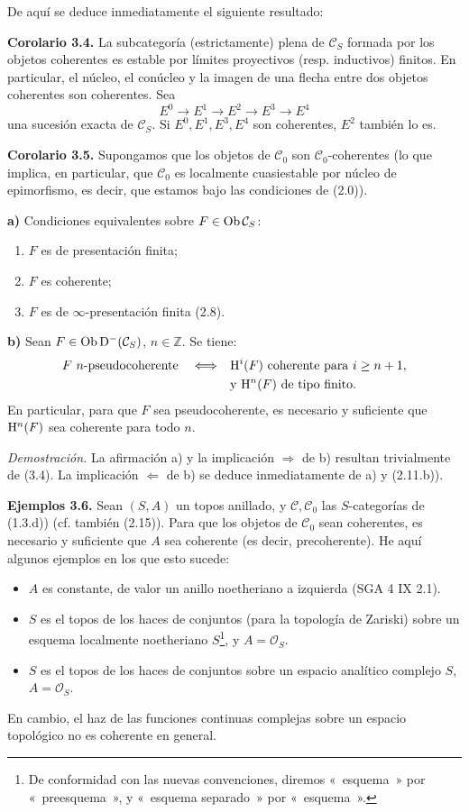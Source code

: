 De aquí se deduce inmediatamente el siguiente resultado:

\textbf{Corolario 3.4.} La subcategoría (estrictamente) plena de \(\mathcal C_S\) formada por los objetos coherentes es estable por límites proyectivos (resp. inductivos) finitos. En particular, el núcleo, el conúcleo y la imagen de una flecha entre dos objetos coherentes son coherentes. Sea
\[
  E^0\longrightarrow E^1\longrightarrow E^2\longrightarrow E^3\longrightarrow E^4
\]
una sucesión exacta de \(\mathcal C_S\). Si \(E^0,E^1,E^3,E^4\) son coherentes, \(E^2\) también lo es.

\textbf{Corolario 3.5.} Supongamos que los objetos de \(\mathcal C_0\) son \(\mathcal C_0\)-coherentes (lo que implica, en particular, que \(\mathcal C_0\) es localmente cuasiestable por núcleo de epimorfismo, es decir, que estamos bajo las condiciones de (2.0)).

\textbf{a)} Condiciones equivalentes sobre \(F\in\operatorname{Ob}\mathcal C_S\):
\begin{enumerate}[label=(\roman*)]
\item \(F\) es de presentación finita;
\item \(F\) es coherente;
\item \(F\) es de \(\infty\)-presentación finita (2.8).
\end{enumerate}

\textbf{b)} Sean \(F\in\operatorname{Ob}\mathrm D^-(\mathcal C_S)\), \(n\in\mathbb Z\). Se tiene:
\[
\begin{split}
F\ n\text{-pseudocoherente}
\quad\Longleftrightarrow\quad&
\mathrm H^i(F)\text{ coherente para }i\geq n+1,\\
&\text{y }\mathrm H^n(F)\text{ de tipo finito.}
\end{split}
\]
En particular, para que \(F\) sea pseudocoherente, es necesario y suficiente que \(\mathrm H^n(F)\) sea coherente para todo \(n\).

\emph{Demostración.} La afirmación a) y la implicación \(\Rightarrow\) de b) resultan trivialmente de (3.4). La implicación \(\Leftarrow\) de b) se deduce inmediatamente de a) y (2.11.b)).

\textbf{Ejemplos 3.6.} Sean \((S,A)\) un topos anillado, y \(\mathcal C,\mathcal C_0\) las \(S\)-categorías de (1.3.d)) (cf. también (2.15)). Para que los objetos de \(\mathcal C_0\) sean coherentes, es necesario y suficiente que \(A\) sea coherente (es decir, precoherente). He aquí algunos ejemplos en los que esto sucede:
\begin{itemize}[label=-]
\item \(A\) es constante, de valor un anillo noetheriano a izquierda (SGA 4 IX 2.1).
\item \(S\) es el topos de los haces de conjuntos (para la topología de Zariski) sobre un esquema localmente noetheriano \(S\)\footnote{De conformidad con las nuevas convenciones, diremos «~esquema~» por «~preesquema~», y «~esquema separado~» por «~esquema~».}, y \(A=\mathcal O_S\).
\item \(S\) es el topos de los haces de conjuntos sobre un espacio analítico complejo \(S\), \(A=\mathcal O_S\).
\end{itemize}
En cambio, el haz de las funciones continuas complejas sobre un espacio topológico no es coherente en general.

